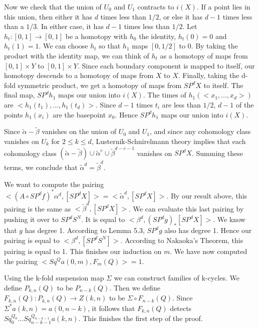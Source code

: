 \documentclass{amsart}
\newtheorem*{Theorem 1}{Theorem 1}
\newtheorem*{Theorem 2}{Theorem 2}
\newtheorem*{Theorem 1A}{Theorem 1A}
\newtheorem*{Theorem 2A}{Theorem 2A}
\newtheorem*{vanishing lemma}{Vanishing Lemma}
\numberwithin{equation}{section}
\begin{document}
Now we check that the union of $U_0$ and $U_1$ contracts to $i(X)$.  If a point
lies in this union, then either it has $d$ times less than $1/2$, or else it has
$d-1$ times less than a $1/3$.  In either case, it has $d-1$ times less than $1/2$.
Let $h_t: [0,1] \rightarrow [0,1]$ be a homotopy with $h_0$ 
the identity, $h_t(0) = 0$ and $h_t(1) = 1$.  We can choose $h_t$ so that $h_1$ maps
$[0,1/2]$ to $0$.  By taking the product with the identity map, we can think of $h_t$
as a homotopy of maps from $[0,1] \times Y$ to $[0,1] \times Y$.  Since each
boundary component is mapped to itself, our homotopy descends to a homotopy of maps
from $X$ to $X$.  Finally, taking the d-fold symmetric product, we get a homotopy
of maps from $SP^d X$ to itself.  The final map, $SP^d h_1$ maps our union into $i(X)$.
The times of $h_1( <x_1, ..., x_d>)$ are $<h_1(t_1), ..., h_1(t_d)>$.  Since
$d-1$ times $t_i$ are less than $1/2$, $d-1$ of the points $h_1(x_i)$ are the basepoint
$x_0$.  Hence $SP^d h_1$ maps our union into $i(X)$.

Since $\tilde \alpha - \tilde \beta$ vanishes on the union of $U_0$ and $U_1$, and since
any cohomology class vanishes on $U_k$ for $2 \le k \le d$, Lusternik-Schnirelmann
theory implies that each cohomology class $(\tilde \alpha - \tilde \beta) \cup \tilde \alpha^e \cup
\tilde \beta^{d-e-1}$ vanishes on $SP^d X$.  Summing these terms, we conclude
that $\tilde \alpha^d = \tilde \beta^d$.

We want to compute the pairing $<(A \circ SP^d f)^* \alpha^d,
[SP^d X]> = <\tilde \alpha^d, [SP^d X]>$.  By our result above,
this pairing is the same as $<\tilde \beta^d, [SP^d X]>$.  We can
evaluate this last pairing by pushing it over to $SP^d S^N$.  It
is equal to $<\beta^d, (SP^d g)_* [SP^d X]>$.  We know that $g$ has
degree 1.  According to Lemma 5.3, $SP^d g$ also has degree 1.   
Hence our pairing is equal to
$<\beta^d, [SP^d S^N]>$.  According to Nakaoka's Theorem, this
pairing is equal to 1.  This finishes our induction on $m$.  We
have now computed the pairing $<Sq^Q a(0,m), F_m(Q)> = 1$.

Using the k-fold suspension map $\Sigma$ we can construct
families of k-cycles.  We define $P_{k,n}(Q)$ to be $P_{n-k}(Q)$. 
Then we define $F_{k,n}(Q): P_{k,n}(Q) \rightarrow Z(k,n)$ to be
$\Sigma \circ F_{n-k}(Q)$.  Since $\Sigma^* a(k,n) = a(0,n-k)$,
it follows that $F_{k,n}(Q)$ detects $Sq_0^{Q_0} ...
Sq_{n-k-1}^{Q_{n-k-1}} a(k,n)$. This finishes the first step of
the proof.
\end{document}
